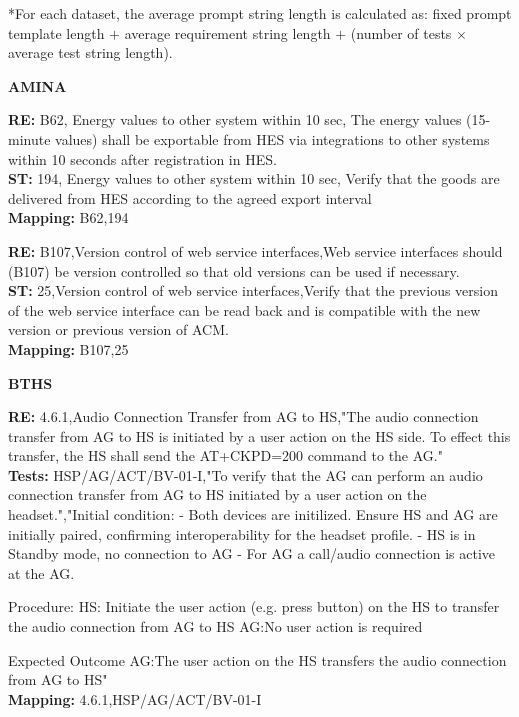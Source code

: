 \documentclass[conference]{IEEEtran}
\begin{document}
*For each dataset, the average prompt string length is calculated as: fixed prompt template length $+$ average requirement string length $+$ (number of tests $\times$ average test string length).

\newpage
{}

\hspace{1.5em}\textbf{AMINA}
\begin{roundedBox-sm}
    \textbf{RE:} B62, Energy values to other system within 10 sec, The energy values (15-minute values) shall be exportable from HES via integrations to other systems within 10 seconds after registration in HES.
    \\[0.5em]
    \textbf{ST:} 194, Energy values to other system within 10 sec, Verify that the goods are delivered from HES according to the agreed export interval
    \\[0.5em]
   \textbf{Mapping:} B62,194
\end{roundedBox-sm}

 \begin{roundedBox-sm}
    \textbf{RE:} B107,Version control of web service interfaces,Web service interfaces should (B107) be version controlled so that old versions can be used if necessary.
    \\[0.5em]
    \textbf{ST:} 25,Version control of web service interfaces,Verify that the previous version of the web service interface can be read back and is compatible with the new version or previous version of ACM.
    \\[0.5em]
    \textbf{Mapping:} B107,25
\end{roundedBox-sm}

\hspace{1.5em}\textbf{BTHS}
\begin{roundedBox-sm}
    \textbf{RE:} 4.6.1,Audio Connection Transfer from AG to HS,"The audio connection transfer from AG to HS is initiated by a user action on the HS side. To effect this transfer, the HS shall send the AT+CKPD=200 command to the AG."
    \\[0.5em]
    \textbf{Tests:} HSP/AG/ACT/BV-01-I,"To verify that the AG can perform an audio connection transfer from AG to HS initiated by a user
action on the headset.","Initial condition: 
- Both devices are initilized. Ensure HS and AG are initially paired, confirming interoperability for the headset profile. 
- HS is in Standby mode, no connection to AG
- For AG a call/audio connection is active at the AG.

Procedure: 
HS: Initiate the user action (e.g. press button) on the HS to transfer the audio connection from AG to HS
AG:No user action is required
  
Expected Outcome AG:The user action on the HS transfers the audio connection from AG to HS"
    \\[0.5em]
    \textbf{Mapping:} 4.6.1,HSP/AG/ACT/BV-01-I
\end{roundedBox-sm}
\end{document}
